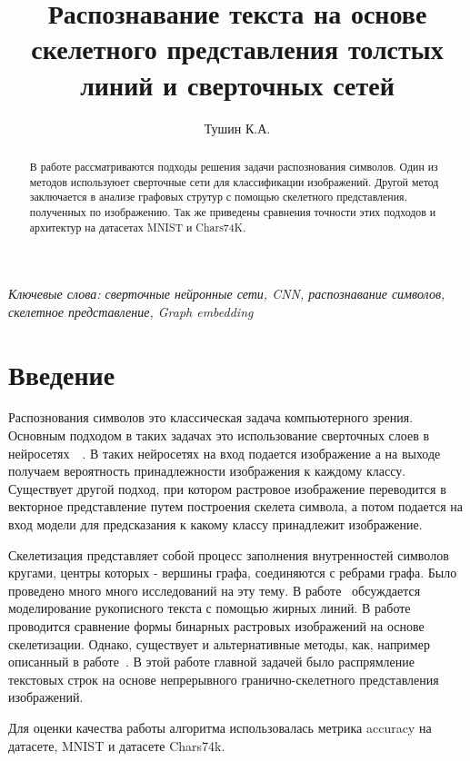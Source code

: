 \documentclass{llncs}
\title{Распознавание текста на основе скелетного представления толстых линий и сверточных сетей }
\author{Тушин К.А.}
\institute{Московский физико-технический институт (Государственный университет) \\ \email{tushin.ka@phystech.edu}}
\begin{document}
\maketitle

\begin{abstract}
В работе рассматриваются подходы решения задачи распознования символов. Один из методов используюет сверточные сети для классификации изображений. Другой метод заключается в анализе графовых струтур с помощью скелетного представления, полученных по изображению. Так же приведены сравнения точности этих подходов и архитектур на датасетах MNIST и Chars74K.
\end{abstract}

\textit{Ключевые слова: сверточные нейронные сети, CNN, распознавание символов, скелетное представление, Graph embedding}

\section{Введение}
Распознования символов это классическая задача компьютерного зрения. Основным подходом в таких задачах это использование сверточных слоев в нейросетях~\cite{cnn_lecun}~\cite{cnn_appl}. В таких нейросетях на вход подается изображение а на выходе получаем вероятность принадлежности изображения к каждому классу. Существует другой подход, при котором растровое изображение переводится в векторное представление путем построения скелета символа, а потом подается на вход модели для предсказания к какому классу принадлежит изображение.

Скелетизация представляет собой процесс заполнения внутренностей символов кругами, центры которых - вершины графа, соединяются с ребрами графа. Было проведено много много исследований на эту тему. В работе~\cite{graphs_gen} обсуждается моделирование рукописного текста с помощью жирных линий. В работе~\cite{graphs_shape_comp} проводится сравнение формы бинарных растровых изображений на основе скелетизации. Однако, существует и альтернативные методы, как, например описанный в работе~\cite{graphs_alt_method}. В этой работе главной задачей было распрямление текстовых строк на основе непрерывного гранично-скелетного представления изображений. 

Для оценки качества работы алгоритма использовалась метрика accuracy
на датасете, MNIST и датасете Chars74k.
\end{document}
